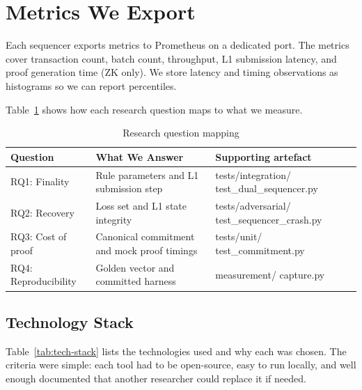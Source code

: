 \section{Metrics We Export}

Each sequencer exports metrics to Prometheus on a dedicated port. The metrics cover transaction count, batch count, throughput, L1 submission latency, and proof generation time (ZK only). We store latency and timing observations as histograms so we can report percentiles.

Table~\ref{tab:research-questions} shows how each research question maps to what we measure.

\begin{table}[htbp]
    \centering
    \small
    \setlength{\tabcolsep}{3pt}
    \renewcommand{\arraystretch}{1.05}
    \begin{tabular}{@{}>{\raggedright\arraybackslash}p{3.0cm}|>{\raggedright\arraybackslash}p{4.0cm}|>{\raggedright\arraybackslash\ttfamily}p{6.0cm}@{}}
        \hline
        \textbf{Question} & \textbf{What We Answer} & \normalfont\textbf{Supporting artefact} \\
        \hline
        RQ1: Finality & Rule parameters and L1 submission step &
            tests/integration/ \newline test\_\allowbreak dual\_\allowbreak sequencer.py \\
        \hline
        RQ2: Recovery & Loss set and L1 state integrity &
            tests/adversarial/ \newline test\_\allowbreak sequencer\_\allowbreak crash.py \\
        \hline
        RQ3: Cost of proof & Canonical commitment and mock proof timings &
            tests/unit/ \newline test\_\allowbreak commitment.py \\
        \hline
        RQ4: Reproducibility & Golden vector and committed harness &
            measurement/ \newline capture.py \\
        \hline
    \end{tabular}
    \caption{Research question mapping}
    \label{tab:research-questions}
\end{table}

\subsection{Technology Stack}

Table~\ref{tab:tech-stack} lists the technologies used and why each was chosen. The criteria were simple: each tool had to be open-source, easy to run locally, and well enough documented that another researcher could replace it if needed.

